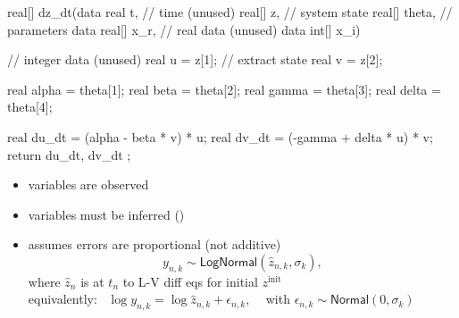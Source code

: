 \documentclass[10pt]{report}
\begin{document}
%
\vspace*{-2pt}
{\footnotesize
\begin{stancode}
  real[] dz_dt(data real t,       // time (unused)
               real[] z,          // system state
               real[] theta,      // parameters
               data real[] x_r,   // real data (unused)
               data int[] x_i) {  // integer data (unused)
    real u = z[1];                // extract state
    real v = z[2];

    real alpha = theta[1];
    real beta = theta[2];
    real gamma = theta[3];
    real delta = theta[4];

    real du_dt = (alpha - beta * v) * u;
    real dv_dt = (-gamma + delta * u) * v;
    return { du_dt, dv_dt };
  }
\end{stancode}
}

%
\vspace*{-2pt}
\begin{itemize}
\item {} variables are observed
\item {} variables must be inferred ()
\item {} assumes errors are proportional (not additive)
\vspace*{-8pt}
\[
y_{n, k} \sim \mathsf{LogNormal}(\hat{z}_{n,k}, \sigma_k),
\]
\vspace*{-4pt}%
{\small where $\hat{z}_n$ is  at $t_n$ to L-V diff eqs for initial
$z^{\mathrm{init}}$}
\\[-3pt]
\vfill
{\small equivalently: \ $\log y_{n,k} = \log \hat{z}_{n,k} + \epsilon_{n,k}$, \ \ with
$\epsilon_{n,k} \sim \mathsf{Normal}(0, \sigma_k)$}
\end{itemize}
\end{document}
